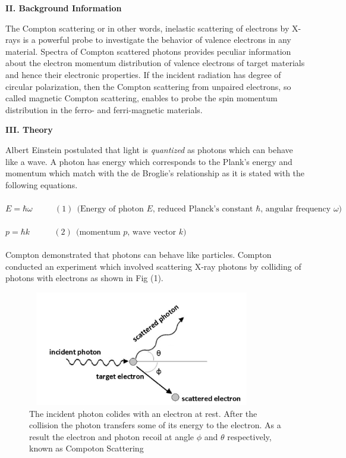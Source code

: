 \documentclass[fleqn]{article}
\begin{document}
  \vspace{30px}

  \textbf{II. Background Information}

  \vspace{10px}

  The Compton scattering or in other words, inelastic scattering of electrons by X-rays is a powerful probe to investigate the behavior of valence 
  electrons in any material. Spectra of Compton scattered photons provides peculiar information about the electron momentum distribution of 
  valence electrons of target materials and hence their electronic properties. If the incident radiation has degree of circular polarization, 
  then the Compton scattering from unpaired electrons, so called magnetic Compton scattering, enables to probe the spin momentum 
  distribution in the ferro- and ferri-magnetic materials.

  \vspace{10px}

  \textbf{III. Theory}

  Albert Einstein postulated that light is \emph{quantized} as photons which can behave like a wave. A photon has energy which corresponds
  to the Plank's energy and momentum which match with the de Broglie's relationship as it is stated with the following equations.
  \\
  \vspace{10px}
  \\
  $E=\hbar \omega ~~~~~~~~~~~~ (1) ~~ \text{(Energy of photon $E$, reduced Planck's constant $\hbar$, angular frequency $\omega$)}$
  \\
  \\
  $p=\hbar k ~~~~~~~~~~~~~ (2) ~~ \text{(momentum $p$, wave vector $k$)}$
  \\
  \\

  Compton demonstrated that photons can behave like particles. Compton conducted an experiment which involved scattering X-ray 
  photons by colliding of photons with electrons as shown in Fig (1).

  \begin{figure}[htbp]
    \includegraphics[height=5cm, width=10cm]{One.JPG}
    \caption{
      The incident photon colides with an electron at rest. After the collision the photon transfers some of its energy to the 
      electron. As a result the electron and photon recoil at angle $\phi$ and $\theta$ respectively, known as Compoton Scattering 
    }
  \end{figure}
\end{document}
